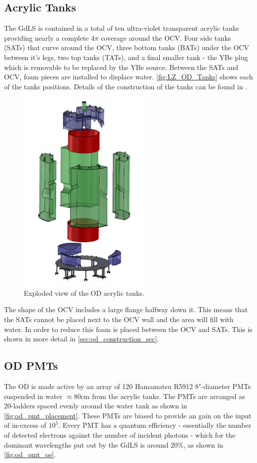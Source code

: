 \subsection{Acrylic Tanks}
\par
The GdLS is contained in a total of ten ultra-violet transparent acrylic tanks providing nearly a complete 4$\pi$ coverage around the OCV.
Four side tanks (SATs) that curve around the OCV, three bottom tanks (BATs) under the OCV between it's legs, two top tanks (TATs), and a final smaller tank - the YBe plug which is removable to be replaced by the YBe source.
Between the SATs and OCV, foam pieces are installed to displace water.
\autoref{fig:LZ_OD_Tanks} shows each of the tanks positions.
Details of the construction of the tanks can be found in \cite{scotthaselschwardt_thesis_ref}.
\begin{figure}
    \centering
    \includegraphics[height=10cm]{Figures/LZ/OD_Tanks_CAD.png}
    \caption{Exploded view of the OD acrylic tanks.}
    \label{fig:LZ_OD_Tanks}
\end{figure}

\par
The shape of the OCV includes a large flange halfway down it. 
This means that the SATs cannot be placed next to the OCV wall and the area will fill with water.
In order to reduce this foam is placed between the OCV and SATs.
This is shown in more detail in \autoref{sec:od_construction_sec}.

\subsection{OD PMTs}
\par
The OD is made active by an array of 120 Hamamatsu R5912 8"-diameter PMTs suspended in water $\approx$80cm from the acrylic tanks.
The PMTs are arranged as 20-ladders spaced evenly around the water tank as shown in \autoref{fig:od_pmt_placement}.
These PMTs are biased to provide an gain on the input of in-excess of $10^{5}$.
Every PMT has a quantum efficiency - essentially the number of detected electrons against the number of incident photons - which for the dominant wavelengths put out by the GdLS is around 20\%, as shown in \autoref{fig:od_pmt_qe}.

